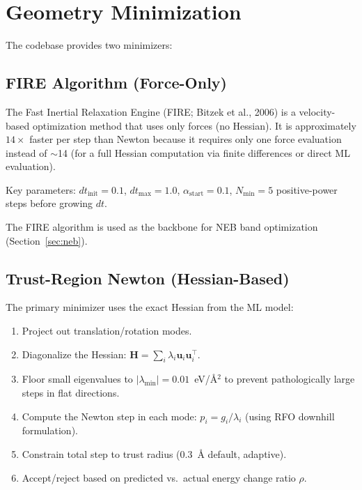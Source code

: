 \documentclass[11pt,a4paper]{article}
\begin{document}
\section{Geometry Minimization}
\label{sec:minimization}

The codebase provides two minimizers:

\subsection{FIRE Algorithm (Force-Only)}

The Fast Inertial Relaxation Engine (FIRE; Bitzek et al., 2006) is a velocity-based optimization method that uses only forces (no Hessian). It is approximately $14\times$ faster per step than Newton because it requires only one force evaluation instead of $\sim$14 (for a full Hessian computation via finite differences or direct ML evaluation).

Key parameters: $dt_\text{init} = 0.1$, $dt_\text{max} = 1.0$, $\alpha_\text{start} = 0.1$, $N_\text{min} = 5$ positive-power steps before growing $dt$.

The FIRE algorithm is used as the backbone for NEB band optimization (Section~\ref{sec:neb}).

\subsection{Trust-Region Newton (Hessian-Based)}

The primary minimizer uses the exact Hessian from the ML model:
\begin{enumerate}
    \item Project out translation/rotation modes.
    \item Diagonalize the Hessian: $\mathbf{H} = \sum_i \lambda_i \mathbf{u}_i \mathbf{u}_i^\top$.
    \item Floor small eigenvalues to $|\lambda_\text{min}| = 0.01$~eV/\AA$^2$ to prevent pathologically large steps in flat directions.
    \item Compute the Newton step in each mode: $p_i = g_i / \lambda_i$ (using RFO downhill formulation).
    \item Constrain total step to trust radius (\SI{0.3}{\angstrom} default, adaptive).
    \item Accept/reject based on predicted vs.\ actual energy change ratio $\rho$.
\end{enumerate}
\end{document}
